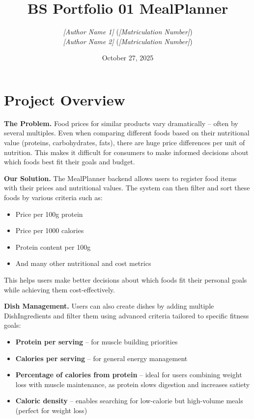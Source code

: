 \documentclass[11pt]{article}
\title{BS Portfolio 01 MealPlanner}
\author{
  \textit{[Author Name 1]} (\textit{[Matriculation Number]})\\
  \textit{[Author Name 2]} (\textit{[Matriculation Number]})
}
\date{October 27, 2025}
\begin{document}
\maketitle

\section{Project Overview}

\textbf{The Problem.} Food prices for similar products vary dramatically – often by several multiples. Even when comparing different foods based on their nutritional value (proteins, carbohydrates, fats), there are huge price differences per unit of nutrition. This makes it difficult for consumers to make informed decisions about which foods best fit their goals and budget.

\textbf{Our Solution.} The MealPlanner backend allows users to register food items with their prices and nutritional values. The system can then filter and sort these foods by various criteria such as:
\begin{itemize}[noitemsep]
  \item Price per 100g protein
  \item Price per 1000 calories
  \item Protein content per 100g
  \item And many other nutritional and cost metrics
\end{itemize}


This helps users make better decisions about which foods fit their personal goals while achieving them cost-effectively.

\textbf{Dish Management.} Users can also create dishes by adding multiple DishIngredients and filter them using advanced criteria tailored to specific fitness goals:

\begin{itemize}[noitemsep]
  \item \textbf{Protein per serving} – for muscle building priorities
  \item \textbf{Calories per serving} – for general energy management
  \item \textbf{Percentage of calories from protein} – ideal for users combining weight loss with muscle maintenance, as protein slows digestion and increases satiety
  \item \textbf{Caloric density} – enables searching for low-calorie but high-volume meals (perfect for weight loss)
\end{itemize}
\end{document}
